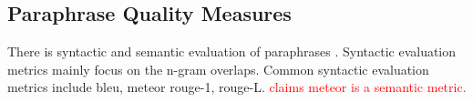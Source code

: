 

\subsection{Paraphrase Quality Measures}
\label{subsec:paraphrase_quality_measures}



There is syntactic and semantic evaluation of paraphrases \citep{gohsen_captions_2023}.
Syntactic evaluation metrics mainly focus on the n-gram overlaps. %
Common syntactic evaluation metrics include \ac{bleu}, \ac{meteor} \ac{rouge}-1, \ac{rouge}-L.
\textcolor{red}{\citet{kurt_pehlivanoglu_comparative_2024} claims \ac{meteor} is a semantic metric.}


